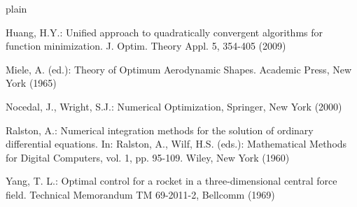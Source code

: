 \documentclass[smallextended,referee,envcountsect,]{svjour3}
\begin{document}
\begin{thebibliography}{plain}


 Huang, H.Y.: Unified approach to quadratically convergent algorithms for function minimization. J. Optim. Theory Appl. 5, 354-405 (2009)

 Miele, A. (ed.): Theory of Optimum Aerodynamic Shapes. Academic Press, New York (1965)


  Nocedal, J., Wright, S.J.: Numerical Optimization, Springer, New York  (2000)

 Ralston, A.: Numerical integration methods for the solution of ordinary differential equations. In: Ralston, A., Wilf, H.S. (eds.): Mathematical Methods for Digital Computers, vol. 1, pp. 95-109. Wiley, New York (1960)

 Yang, T. L.: Optimal control for a rocket in a three-dimensional central force field. Technical Memorandum TM 69-2011-2, Bellcomm (1969)


\end{thebibliography}
\end{document}
